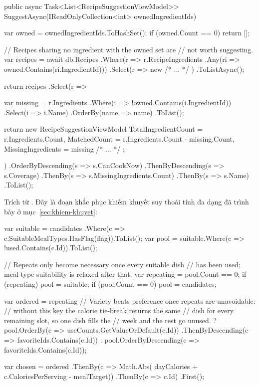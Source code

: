 \begin{codeblock}
public async Task<List<RecipeSuggestionViewModel>>
    SuggestAsync(IReadOnlyCollection<int> ownedIngredientIds)
{
    var owned = ownedIngredientIds.ToHashSet();
    if (owned.Count == 0)
        return [];

    // Recipes sharing no ingredient with the owned set are
    // not worth suggesting.
    var recipes = await db.Recipes
        .Where(r => r.RecipeIngredients
            .Any(ri => owned.Contains(ri.IngredientId)))
        .Select(r => new { /* ... */ })
        .ToListAsync();

    return recipes
        .Select(r =>
        {
            var missing = r.Ingredients
                .Where(i => !owned.Contains(i.IngredientId))
                .Select(i => i.Name)
                .OrderBy(name => name)
                .ToList();

            return new RecipeSuggestionViewModel
            {
                TotalIngredientCount = r.Ingredients.Count,
                MatchedCount =
                    r.Ingredients.Count - missing.Count,
                MissingIngredients = missing
                /* ... */
            };
        })
        .OrderByDescending(s => s.CanCookNow)
        .ThenByDescending(s => s.Coverage)
        .ThenBy(s => s.MissingIngredients.Count)
        .ThenBy(s => s.Name)
        .ToList();
}
\end{codeblock}


{\raggedright Trích từ . Đây là đoạn
khắc phục khiếm khuyết suy thoái tính đa dạng đã trình bày ở
mục~\ref{sec:khiem-khuyet}:\par}

\begin{codeblock}
var suitable = candidates
    .Where(c => c.SuitableMealTypes.HasFlag(flag)).ToList();
var pool = suitable.Where(c => !used.Contains(c.Id)).ToList();

// Repeats only become necessary once every suitable dish
// has been used; meal-type suitability is relaxed after that.
var repeating = pool.Count == 0;
if (repeating) pool = suitable;
if (pool.Count == 0) pool = candidates;

var ordered = repeating
    // Variety beats preference once repeats are unavoidable:
    // without this key the calorie tie-break returns the same
    // dish for every remaining slot, so one dish fills the
    // week and the rest go unused.
    ? pool.OrderBy(c => useCounts.GetValueOrDefault(c.Id))
        .ThenByDescending(c => favoriteIds.Contains(c.Id))
    : pool.OrderByDescending(c => favoriteIds.Contains(c.Id));

var chosen = ordered
    .ThenBy(c => Math.Abs(
        dayCalories + c.CaloriesPerServing - mealTarget))
    .ThenBy(c => c.Id)
    .First();
\end{codeblock}

